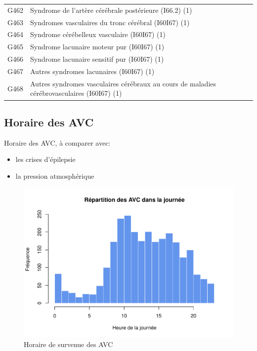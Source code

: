\documentclass[12pt,english,french,twoside]{book}\usepackage[]{graphicx}\usepackage[]{color}
\makeatletter
\def\maxwidth{ %
  \ifdim\Gin@nat@width>\linewidth
    \linewidth
  \else
    \Gin@nat@width
  \fi
}
\newenvironment{knitrout}{}{} %
\makeatother
\begin{document}
{\begin{longtable}{|l|l|}
 G462 & Syndrome de l'artère cérébrale postérieure (I66.2) (1) \\
 G463 & Syndromes vasculaires du tronc cérébral (I60I67) (1) \\
 G464 & Syndrome cérébelleux vasculaire (I60I67) (1) \\
 G465 & Syndrome lacunaire moteur pur (I60I67) (1) \\
 G466 & Syndrome lacunaire sensitif pur (I60I67) (1) \\
 G467 & Autres syndromes lacunaires (I60I67) (1) \\
 G468 & Autres syndromes vasculaires cérébraux au cours de maladies cérébrovasculaires (I60I67) (1) \\
  \hline
\end{longtable}
} %



\subsection*{Horaire des AVC}


Horaire des AVC, à comparer avec:
\begin{itemize}
  \item les crises d'épilepsie
  \item la pression atmosphérique
\end{itemize}

\begin{figure}[ht!]
 \centering
\begin{knitrout}
\color{fgcolor}
\includegraphics[width=\maxwidth]{figure/heure_avc-1} 

\end{knitrout}
 \caption{Horaire de survenue des AVC}
 \label{fig:horaire_avc}
\end{figure}
\end{document}
